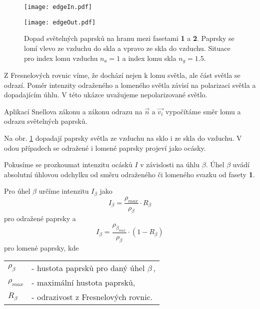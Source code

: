 \begin{figure}[htp]
\centering
\begin{minipage}[c]{0.48\textwidth}
\texttt{[image: edgeIn.pdf]}
\end{minipage}
\begin{minipage}[c]{0.48\textwidth}
\texttt{[image: edgeOut.pdf]}
\end{minipage}
\caption{Dopad světelných paprsků na hranu mezi fasetami \textbf{1} a \textbf{2}. Paprsky se lomí vlevo ze vzduchu do skla a vpravo ze skla do vzduchu. Situace pro index lomu vzduchu $n_a = 1$ a index lomu skla $n_g = 1.5$.}
\label{fig:edgeIn}
\end{figure}
Z Fresnelových rovnic víme, že dochází nejen k lomu světla, ale část světla se odrazí. Poměr intenzity odraženého a lomeného světla závisí na polarizaci světla a dopadajícím úhlu. V této ukázce uvažujeme nepolarizované světlo. 

Aplikací Snellova zákonu a zákonu odrazu na $\vec{n}$ a $\vec{v_i}$ vypočítáme směr lomu a odrazu světelných paprsků.

Na obr. \ref{fig:edgeIn} dopadají paprsky světla ze vzduchu na sklo i ze skla do vzduchu. V odou případech se odražené i lomené paprsky projeví jako ocásky.

Pokusíme se prozkoumat intenzitu ocásků $I$ v závislosti na úhlu $\beta$. Úhel $\beta$ uvádí absolutní úhlovou odchylku od směru odraženého či lomeného svazku od fasety \textbf{1}.  

Pro úhel $\beta$ určíme intenzitu  $I_\beta$ jako   
\begin{equation}
 I_\beta  = \frac{\rho_{{max}}}{\rho_\beta}\cdot R_\beta
\end{equation}
pro odražené paprsky a 
\begin{equation}
 I_\beta  = \frac{\rho_{\beta_{max}}}{\rho_\beta}\cdot (1-R_\beta)
\end{equation}
pro lomené paprsky, kde  

	\begin{tabular}{l l}
	$\rho_{\beta}$ & 	- hustota paprsků pro daný úhel $\beta\,$,\\
	$\rho_{{max}}$  	&	- maximální hustota paprsků,\\
	$R_\beta$		&	- odrazivost z Fresnelových rovnic.	 \\
	
	\end{tabular}
	\vspace{1mm}

